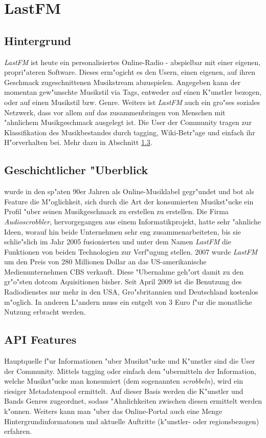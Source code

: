 \section{LastFM}
\subsection{Hintergrund}
\textit{LastFM} ist heute ein personalisiertes Online-Radio - abspielbar mit einer eigenen, propri"ateren Software. Dieses erm"ogicht es den Usern, einen eigenen, auf ihren Geschmack zugeschnittenen Musikstream abzuspielen. Angegeben kann der momentan gew"unschte Musikstil via Tags, entweder auf einen K"unstler bezogen, oder auf einen Musikstil bzw. Genre.
Weiters ist \textit{LastFM} auch ein gro"ses soziales Netzwerk, dass vor allem auf das zusammenbringen von Menschen mit "ahnlichem Musikgeschmack ausgelegt ist. Die User der Community tragen zur Klassifikation des Musikbestandes durch tagging, Wiki-Betr"age und einfach ihr H"orverhalten bei. Mehr dazu in Abschnitt \ref{features_lastfm}.

\subsection{Geschichtlicher "Uberblick}
 wurde in den sp"aten 90er Jahren als Online-Musiklabel gegr"undet und bot als Feature die M"oglichkeit, sich durch die Art der konsumierten Musikst"ucke ein Profil "uber seinen Musikgeschmack zu erstellen zu erstellen. Die Firma \textit{Audioscrobbler}, hervorgegangen aus einem Informatikprojekt, hatte sehr "ahnliche Ideen, worauf hin beide Unternehmen sehr eng zusammenarbeiteten, bis sie schlie"slich im Jahr 2005 fusionierten und unter dem Namen \textit{LastFM} die Funktionen von beiden Technologien zur Verf"ugung stellen.
2007 wurde \textit{LastFM} um den Preis von 280 Millionen Dollar an das US-amerikanische Medienunternehmen CBS verkauft. Diese "Ubernahme geh"ort damit zu den gr"o"sten dotcom Aquisitionen bisher. 
Seit April 2009 ist die Benutzung des Radiodienstes nur mehr in den USA, Gro"sbritannien und Deutschland kostenlos m"oglich. In anderen L"andern muss ein entgelt von 3 Euro f"ur die monatliche Nutzung erbracht werden.


\subsection{API Features}
\label{features_lastfm}
Hauptquelle f"ur Informationen "uber Musikst"ucke und K"unstler sind die User der Community. Mittels tagging oder einfach dem "ubermitteln der Information, welche Musikst"ucke man konsumiert (dem sogenannten \textit{scrobbeln}), wird ein riesiger Metadatenpool ermittelt. Auf dieser Basis werden die K"unstler und Bands Genres zugeordnet, sodass "Ahnlichkeiten zwischen diesen ermittelt werden k"onnen. 
Weiters kann man "uber das Online-Portal auch eine Menge Hintergrundinformatonen und aktuelle Auftritte (k"unstler- oder regionsbezogen) erfahren. 

